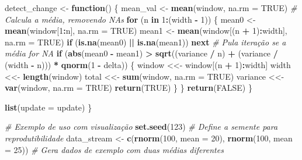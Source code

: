 \documentclass[
]{article}
\newenvironment{Shaded}{\begin{snugshade}}{\end{snugshade}}
\newcommand{\AttributeTok}[1]{\textcolor[rgb]{0.13,0.29,0.53}{#1}}
\newcommand{\CommentTok}[1]{\textcolor[rgb]{0.56,0.35,0.01}{\textit{#1}}}
\newcommand{\ConstantTok}[1]{\textcolor[rgb]{0.56,0.35,0.01}{#1}}
\newcommand{\ControlFlowTok}[1]{\textcolor[rgb]{0.13,0.29,0.53}{\textbf{#1}}}
\newcommand{\DecValTok}[1]{\textcolor[rgb]{0.00,0.00,0.81}{#1}}
\newcommand{\FunctionTok}[1]{\textcolor[rgb]{0.13,0.29,0.53}{\textbf{#1}}}
\newcommand{\NormalTok}[1]{#1}
\newcommand{\OtherTok}[1]{\textcolor[rgb]{0.56,0.35,0.01}{#1}}
\newcommand{\SpecialCharTok}[1]{\textcolor[rgb]{0.81,0.36,0.00}{\textbf{#1}}}
\begin{document}
\begin{Shaded}
\begin{Highlighting}[]
\NormalTok{  detect\_change }\OtherTok{\textless{}{-}} \ControlFlowTok{function}\NormalTok{() \{}
\NormalTok{    mean\_val }\OtherTok{\textless{}{-}} \FunctionTok{mean}\NormalTok{(window, }\AttributeTok{na.rm =} \ConstantTok{TRUE}\NormalTok{) }\CommentTok{\# Calcula a média, removendo NAs}
    \ControlFlowTok{for}\NormalTok{ (n }\ControlFlowTok{in} \DecValTok{1}\SpecialCharTok{:}\NormalTok{(width }\SpecialCharTok{{-}} \DecValTok{1}\NormalTok{)) \{}
\NormalTok{      mean0 }\OtherTok{\textless{}{-}} \FunctionTok{mean}\NormalTok{(window[}\DecValTok{1}\SpecialCharTok{:}\NormalTok{n], }\AttributeTok{na.rm =} \ConstantTok{TRUE}\NormalTok{)}
\NormalTok{      mean1 }\OtherTok{\textless{}{-}} \FunctionTok{mean}\NormalTok{(window[(n }\SpecialCharTok{+} \DecValTok{1}\NormalTok{)}\SpecialCharTok{:}\NormalTok{width], }\AttributeTok{na.rm =} \ConstantTok{TRUE}\NormalTok{)}
      \ControlFlowTok{if}\NormalTok{ (}\FunctionTok{is.na}\NormalTok{(mean0) }\SpecialCharTok{||} \FunctionTok{is.na}\NormalTok{(mean1)) }\ControlFlowTok{next} \CommentTok{\# Pula iteração se a média for NA}
      \ControlFlowTok{if}\NormalTok{ (}\FunctionTok{abs}\NormalTok{(mean0 }\SpecialCharTok{{-}}\NormalTok{ mean1) }\SpecialCharTok{\textgreater{}} \FunctionTok{sqrt}\NormalTok{((variance }\SpecialCharTok{/}\NormalTok{ n) }\SpecialCharTok{+}\NormalTok{ (variance }\SpecialCharTok{/}\NormalTok{ (width }\SpecialCharTok{{-}}\NormalTok{ n))) }\SpecialCharTok{*} \FunctionTok{qnorm}\NormalTok{(}\DecValTok{1} \SpecialCharTok{{-}}\NormalTok{ delta)) \{}
\NormalTok{        window }\OtherTok{\textless{}\textless{}{-}}\NormalTok{ window[(n }\SpecialCharTok{+} \DecValTok{1}\NormalTok{)}\SpecialCharTok{:}\NormalTok{width]}
\NormalTok{        width }\OtherTok{\textless{}\textless{}{-}} \FunctionTok{length}\NormalTok{(window)}
\NormalTok{        total }\OtherTok{\textless{}\textless{}{-}} \FunctionTok{sum}\NormalTok{(window, }\AttributeTok{na.rm =} \ConstantTok{TRUE}\NormalTok{)}
\NormalTok{        variance }\OtherTok{\textless{}\textless{}{-}} \FunctionTok{var}\NormalTok{(window, }\AttributeTok{na.rm =} \ConstantTok{TRUE}\NormalTok{)}
        \FunctionTok{return}\NormalTok{(}\ConstantTok{TRUE}\NormalTok{)}
\NormalTok{      \}}
\NormalTok{    \}}
    \FunctionTok{return}\NormalTok{(}\ConstantTok{FALSE}\NormalTok{)}
\NormalTok{  \}}
  
  \FunctionTok{list}\NormalTok{(}\AttributeTok{update =}\NormalTok{ update)}
\NormalTok{\}}

\CommentTok{\# Exemplo de uso com visualização}
\FunctionTok{set.seed}\NormalTok{(}\DecValTok{123}\NormalTok{) }\CommentTok{\# Define a semente para reprodutibilidade}
\NormalTok{data\_stream }\OtherTok{\textless{}{-}} \FunctionTok{c}\NormalTok{(}\FunctionTok{rnorm}\NormalTok{(}\DecValTok{100}\NormalTok{, }\AttributeTok{mean =} \DecValTok{20}\NormalTok{), }\FunctionTok{rnorm}\NormalTok{(}\DecValTok{100}\NormalTok{, }\AttributeTok{mean =} \DecValTok{25}\NormalTok{)) }\CommentTok{\# Gera dados de exemplo com duas médias diferentes}


\end{Highlighting}
\end{Shaded}
\end{document}
